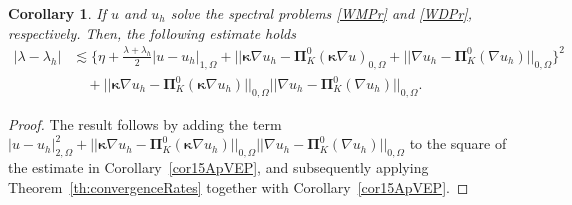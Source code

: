 \documentclass[final,reqno]{elsarticle}
\newtheorem{corollary}{Corollary}[section]
\def\bkappa{\boldsymbol{\kappa}}
\def\bPi{\mathbf{\Pi}}
\begin{document}
\begin{corollary}\label{cor16ApVEP}
      If  $u$ and $u_h$ solve the spectral problems \eqref{WMPr} and \eqref{WDPr}, respectively. Then, the following estimate holds   
         \begin{align}
        |\lambda-\lambda_h|&\lesssim \Big\{\eta + \frac{\lambda + \lambda_h}{2}|u-u_h|_{1,\Omega} +||\bkappa \nabla u_h - \bPi_K^0(\bkappa \nabla u)_{0,\Omega} + ||\nabla u_h - \bPi_K^0(\nabla u_h)||_{0,\Omega}\Big\}^2\nonumber\\
        &\quad +||\bkappa \nabla u_h-\bPi_K^0(\bkappa \nabla u_h)||_{0,\Omega} ||\nabla u_h -\bPi_K^0(\nabla u_h) ||_{0,\Omega}.\nonumber
    \end{align} 
\end{corollary}
\begin{proof}
    The result follows by adding the term $|u-u_h|_{2,\Omega}^2+||\bkappa \nabla u_h-\bPi_K^0(\bkappa \nabla u_h)||_{0,\Omega} ||\nabla u_h -\bPi_K^0(\nabla u_h) ||_{0,\Omega}$ to the square of the estimate in Corollary~\ref{cor15ApVEP}, and subsequently applying Theorem~\ref{th:convergenceRates} together with Corollary~\ref{cor15ApVEP}.
\end{proof}
\end{document}
